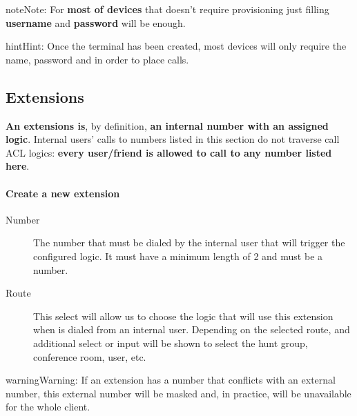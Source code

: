 \documentclass[letterpaper,10pt,english]{sphinxmanual}
\begin{document}
\begin{notice}{note}{Note:}
For \textbf{most of devices} that doesn't require provisioning just
filling \textbf{username} and \textbf{password} will be enough.
\end{notice}

\begin{notice}{hint}{Hint:}
Once the terminal has been created, most devices will only
require the name, password and {\hyperref[getting_started/internal_calls/brand_portal:domain\string-per\string-client]{}}
in order to place calls.
\end{notice}


\subsection{Extensions}
\label{administration_portal/client/vpbx/extensions:extensions}\label{administration_portal/client/vpbx/extensions::doc}\label{administration_portal/client/vpbx/extensions:id1}
\textbf{An extensions is}, by definition, \textbf{an internal number with an assigned
logic}. Internal users' calls to numbers listed in this section do not traverse
call ACL logics: \textbf{every user/friend is allowed to call to any number listed here}.
\paragraph{Create a new extension}
\begin{description}
\item[{Number}] \leavevmode
The number that must be dialed by the internal user that will trigger
the configured logic. It must have a minimum length of 2 and must be
a number.

\item[{Route}] \leavevmode
This select will allow us to choose the logic that will use this
extension when is dialed from an internal user. Depending on the selected
route, and additional select or input will be shown to select the
hunt group, conference room, user, etc.

\end{description}

\begin{notice}{warning}{Warning:}
If an extension has a number that conflicts with an external
number, this external number will be masked and, in practice, will be
unavailable for the whole client.
\end{notice}
\end{document}
